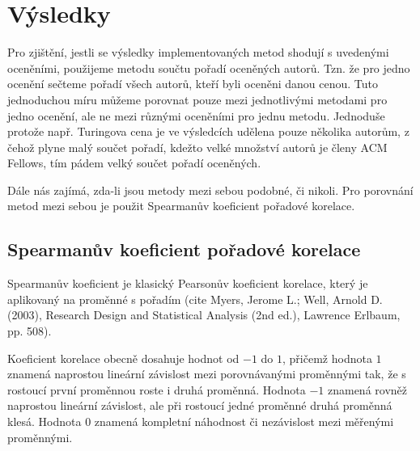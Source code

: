 \documentclass[12pt,titlepage]{report}
\begin{document}





\chapter{Výsledky}

Pro zjištění, jestli se výsledky implementovaných metod shodují s uvedenými
oceněními, použijeme metodu součtu pořadí oceněných autorů. Tzn. že pro jedno
ocenění sečteme pořadí všech autorů, kteří byli oceněni danou cenou. Tuto
jednoduchou míru můžeme porovnat pouze mezi jednotlivými metodami pro jedno
ocenění, ale ne mezi různými oceněními pro jednu metodu. Jednoduše protože
např. Turingova cena je ve výsledcích udělena pouze několika autorům, z čehož
plyne malý součet pořadí, kdežto velké množství autorů je členy ACM Fellows,
tím pádem velký součet pořadí oceněných.


Dále nás zajímá, zda-li jsou metody mezi sebou podobné, či nikoli. Pro
porovnání metod mezi sebou je použit Spearmanův koeficient pořadové korelace.

\section{Spearmanův koeficient pořadové korelace}
Spearmanův koeficient je klasický Pearsonův koeficient korelace, který je
aplikovaný na proměnné s pořadím (cite Myers, Jerome L.; Well, Arnold D.
(2003), Research Design and Statistical Analysis (2nd ed.), Lawrence Erlbaum,
pp. 508).

Koeficient korelace obecně dosahuje hodnot od $-1$ do $1$, přičemž hodnota $1$
znamená naprostou lineární závislost mezi porovnávanými proměnnými tak, že s
rostoucí první proměnnou roste i druhá proměnná. Hodnota $-1$ znamená rovněž
naprostou lineární závislost, ale při rostoucí jedné proměnné druhá proměnná
klesá. Hodnota $0$ znamená kompletní náhodnost či nezávislost mezi měřenými
proměnnými.
\end{document}
